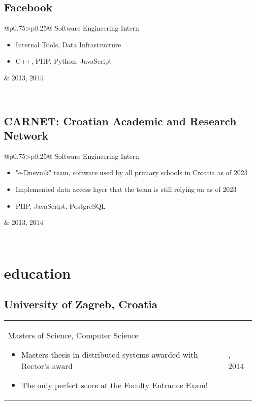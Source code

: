 \documentclass[a4paper]{article}
\makeatletter
\newlength{\tablewidth}
\newenvironment{period}[2]{%
\newcommand{\sarma}{#2}%
\setlength{\tablewidth}{\linewidth}
\addtolength{\tablewidth}{-2\tabcolsep}
\begin{tabular}{@{}p{0.75\tablewidth}>{\raggedleft\arraybackslash}p{0.25\tablewidth}@{}}%
#1 \newline
\begin{itemize}
}{%
\end{itemize} & \sarma \\%
\end{tabular}\\
}
\makeatother
\begin{document}
\subsection{Facebook}
\begin{period}{Software Engineering Intern}{2013, 2014}
    \item Internal Tools, Data Infrastructure
    \item C++, PHP, Python, JavaScript
\end{period}

\subsection{CARNET: Croatian Academic and Research Network}
\begin{period}{Software Engineering Intern}{2010 -- 2013}
    \item "e-Dnevnik" team, software used by all primary schools in Croatia as of 2023
    \item Implemented data access layer that the team is still relying on as of 2023
    \item PHP, JavaScript, PostgreSQL
\end{period}

\section{education}
\subsection{University of Zagreb, Croatia}
\begin{period}{Masters of Science, Computer Science}{2008 -- 2013}
    \item Masters thesis in distributed systems awarded with Rector's award
    \item The only perfect score at the Faculty Entrance Exam!
\end{period}
\end{document}
